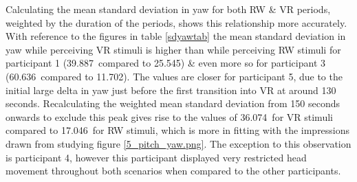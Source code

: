 Calculating the mean standard deviation in yaw for both RW \& VR periods, weighted by the duration of the periods, shows this relationship more accurately. With reference to the figures in table \ref{sdyawtab} the mean standard deviation in yaw while perceiving VR stimuli is higher than while perceiving RW stimuli for participant 1 (39.887\textdegree\ compared to 25.545\textdegree) \& even more so for participant 3 (60.636\textdegree\ compared to 11.702\textdegree). The values are closer for participant 5, due to the initial large delta in yaw just before the first transition into VR at around 130 seconds. Recalculating the weighted mean standard deviation from 150 seconds onwards to exclude this peak gives rise to the values of 36.074\textdegree\ for VR stimuli compared to 17.046\textdegree\ for RW stimuli, which is more in fitting with the impressions drawn from studying figure \ref{5_pitch_yaw.png}. The exception to this observation is participant 4, however this participant displayed very restricted head movement throughout both scenarios when compared to the other participants.

